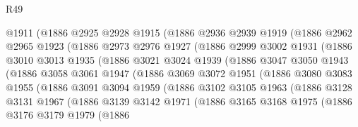 \begin{lexlean}{R49}
\begin{coremodule}
              @1911
              (@1886
                @2925
                @2928
                @1915
                (@1886
                  @2936
                  @2939
                  @1919
                  (@1886
                    @2962
                    @2965
                    @1923
                    (@1886
                      @2973
                      @2976
                      @1927
                      (@1886
                        @2999
                        @3002
                        @1931
                        (@1886
                          @3010
                          @3013
                          @1935
                          (@1886
                            @3021
                            @3024
                            @1939
                            (@1886
                              @3047
                              @3050
                              @1943
                              (@1886
                                @3058
                                @3061
                                @1947
                                (@1886
                                  @3069
                                  @3072
                                  @1951
                                  (@1886
                                    @3080
                                    @3083
                                    @1955
                                    (@1886
                                      @3091
                                      @3094
                                      @1959
                                      (@1886
                                        @3102
                                        @3105
                                        @1963
                                        (@1886
                                          @3128
                                          @3131
                                          @1967
                                          (@1886
                                            @3139
                                            @3142
                                            @1971
                                            (@1886
                                              @3165
                                              @3168
                                              @1975
                                              (@1886
                                                @3176
                                                @3179
                                                @1979
                                                (@1886

\end{coremodule}
\end{lexlean}
